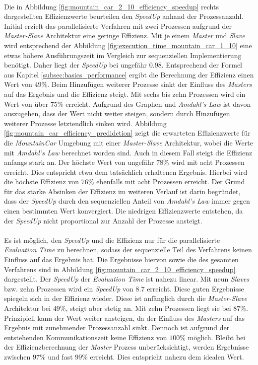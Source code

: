 \\ \noindent
Die in Abbildung \ref{fig:mountain_car_2_10_efficiency_speedup} rechts dargestellten Effizienzwerte beurteilen den \emph{SpeedUp} anhand der Prozessanzahl. Initial erzielt das parallelisierte Verfahren mit zwei Prozessen aufgrund der \emph{Master-Slave} Architektur eine geringe Effizienz. Mit je einem \emph{Master} und \emph{Slave} wird entsprechend der Abbildung \ref{fig:execution_time_mountain_car_1_10} eine etwas höhere Ausführungszeit im Vergleich zur sequenziellen Implementierung benötigt. Daher liegt der \emph{SpeedUp} bei ungefähr $0.98$. Entsprechend der Formel aus Kapitel \ref{subsec:basics_performance} ergibt die Berechnung der Effizienz einen Wert von $49\%$. Beim Hinzufügen weiterer Prozesse sinkt der Einfluss des \emph{Masters} auf das Ergebnis und die Effizienz steigt. Mit sechs bis zehn Prozessen wird ein Wert von über $75\%$ erreicht. Aufgrund des Graphen und \emph{Amdahl's Law} ist davon auszugehen, dass der Wert nicht weiter steigen, sondern durch Hinzufügen weiterer Prozesse letztendlich sinken wird. Abbildung \ref{fig:mountain_car_efficiency_predidction} zeigt die erwarteten Effizienzwerte für die \emph{MountainCar} Umgebung mit einer \emph{Master-Slave} Architektur, wobei die Werte mit \emph{Amdahl's Law} berechnet worden sind. Auch in diesem Fall steigt die Effizienz anfangs stark an. Der höchste Wert von ungefähr $78\%$ wird mit acht Prozessen erreicht. Dies entspricht etwa dem tatsächlich erhaltenen Ergebnis. Hierbei wird die höchste Effizienz von $76\%$ ebenfalls mit acht Prozessen erreicht. Der Grund für das starke Absinken der Effizienz im weiteren Verlauf ist darin begründet, dass der \emph{SpeedUp} durch den sequenziellen Anteil von \emph{Amdahl's Law} immer gegen einen bestimmten Wert konvergiert. Die niedrigen Effizienzwerte entstehen, da der \emph{SpeedUp} nicht proportional zur Anzahl der Prozesse ansteigt.
\\\\
Es ist möglich, den \emph{SpeedUp} und die Effizienz nur für die parallelisierte \emph{Evaluation Time} zu berechnen, sodass der sequenzielle Teil des Verfahrens keinen Einfluss auf das Ergebnis hat. Die Ergebnisse hiervon sowie die des gesamten Verfahrens sind in Abbildung \ref{fig:mountain_car_2_10_efficiency_speedup} dargestellt. Der \emph{SpeedUp} der \emph{Evaluation Time} ist nahezu linear. Mit neun \emph{Slaves} bzw. zehn Prozessen wird ein \emph{SpeedUp} von $8.7$ erreicht. Diese guten Ergebnisse spiegeln sich in der Effizienz wieder. Diese ist anfänglich durch die \emph{Master-Slave} Architektur bei $49\%$, steigt aber stetig an. Mit zehn Prozessen liegt sie bei $87\%$. Prinzipiell kann der Wert weiter ansteigen, da der Einfluss des \emph{Masters} auf das Ergebnis mit zunehmender Prozessanzahl sinkt. Dennoch ist aufgrund der entstehenden Kommunikationszeit keine Effizienz von $100\%$ möglich. Bleibt bei der Effizienzberechnung der \emph{Master} Prozess unberücksichtigt, werden Ergebnisse zwischen $97\%$ und fast $99\%$ erreicht. Dies entspricht nahezu dem idealen Wert.

